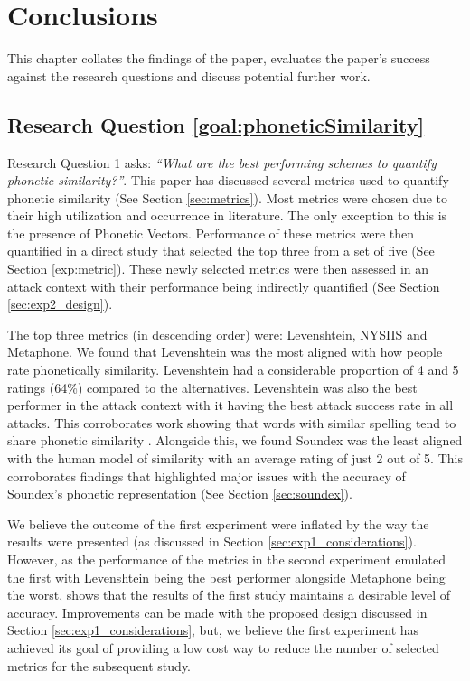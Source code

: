 \chapter{Conclusions}
This chapter collates the findings of the paper, evaluates the paper's success against the research questions and discuss potential further work.

\section{Research Question \ref{goal:phoneticSimilarity}}

Research Question 1 asks: \textit{“What are the best performing schemes to quantify phonetic similarity?”}. This paper has discussed several metrics used to quantify phonetic similarity (See Section \ref{sec:metrics}). Most metrics were chosen due to their high utilization and occurrence in literature. The only exception to this is the presence of Phonetic Vectors. Performance of these metrics were then quantified in a direct study that selected the top three from a set of five (See Section \ref{exp:metric}). These newly selected metrics were then assessed in an attack context with their performance being indirectly quantified (See Section \ref{sec:exp2_design}).

The top three metrics (in descending order) were: Levenshtein, NYSIIS and Metaphone. We found that Levenshtein was the most aligned with how people rate phonetically similarity. Levenshtein had a considerable proportion of 4 and 5 ratings (64\%) compared to the alternatives. Levenshtein was also the best performer in the attack context with it having the best attack success rate in all attacks. This corroborates work showing that words with similar spelling tend to share phonetic similarity \cite{hettiarachchi2012sparcl}.
Alongside this, we found Soundex was the least aligned with the human model of similarity with an average rating of just 2 out of 5. This corroborates findings that highlighted major issues with the accuracy of Soundex’s phonetic representation (See Section \ref{sec:soundex}).

We believe the outcome of the first experiment were inflated by the way the results were presented (as discussed in Section \ref{sec:exp1_considerations}). However, as the performance of the metrics in the second experiment emulated the first with Levenshtein being the best performer alongside Metaphone being the worst, shows that the results of the first study maintains a desirable level of accuracy. Improvements can be made with the proposed design discussed in Section \ref{sec:exp1_considerations}, but, we believe the first experiment has achieved its goal of providing a low cost way to reduce the number of selected metrics for the subsequent study.

